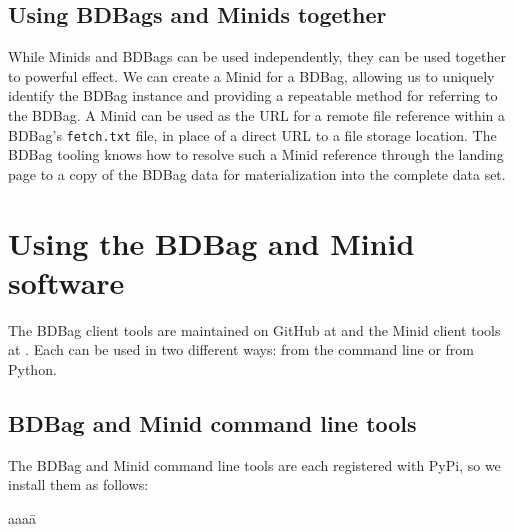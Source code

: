 \documentclass[11pt]{article}
\begin{document}
\subsection{Using BDBags and Minids together} 

While Minids and BDBags can be used independently, they can be used together to powerful effect. 
We can create a Minid for a BDBag, 
allowing us to uniquely identify the BDBag instance and providing a repeatable method for referring to the BDBag. 
A Minid can be used as the URL for a remote file reference within a BDBag's \texttt{fetch.txt} file,
in place of a direct URL to a file storage location.  
The BDBag tooling knows how to resolve such a Minid reference
through the landing page to a copy of the BDBag data
for materialization into the complete data set.  



\section{Using the BDBag and Minid software}

The BDBag client tools are maintained on GitHub at  and the 
Minid client tools at .
Each can be used in two different ways: from the command line or from Python.

\subsection{BDBag and Minid command line tools} 

The BDBag and Minid command line tools are each registered with PyPi, 
so we install them as follows:
\vspace{-1ex}
\begin{tabbing}
aaaa\=\kill
\>\\
\>
\end{tabbing}
\end{document}
